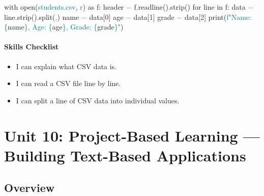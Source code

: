 \documentclass[
  justified,
  openright,
]{tufte-book}
\let\subsubsection\paragraph
\let\paragraph\paragraph
\newcommand{\BuiltInTok}[1]{#1}
\newcommand{\ControlFlowTok}[1]{\textcolor{BrandBlue}{#1}}
\newcommand{\DecValTok}[1]{\textcolor{Purple}{#1}}
\newcommand{\ImportTok}[1]{\textcolor{BrandAccent}{#1}}
\newcommand{\KeywordTok}[1]{\textcolor{BrandBlue}{#1}}
\newcommand{\NormalTok}[1]{#1}
\newcommand{\OperatorTok}[1]{\textcolor{DarkGray}{#1}}
\newcommand{\SpecialCharTok}[1]{\textcolor{Teal}{#1}}
\newcommand{\SpecialStringTok}[1]{\textcolor{Teal}{#1}}
\newcommand{\StringTok}[1]{\textcolor{Teal}{#1}}
\newenvironment{Shaded}{%
  \begin{snugshade}
}{%
  \end{snugshade}
}
\let\subsubsection\paragraph
\let\paragraph\paragraph
\providecommand{\tightlist}{%
  \setlength{\itemsep}{0pt}\setlength{\parskip}{0pt}}
\begin{document}
\begin{Shaded}
\begin{Highlighting}[]
\ControlFlowTok{with} \BuiltInTok{open}\NormalTok{(}\StringTok{\textquotesingle{}students.csv\textquotesingle{}}\NormalTok{, }\StringTok{\textquotesingle{}r\textquotesingle{}}\NormalTok{) }\ImportTok{as}\NormalTok{ f:}
\NormalTok{    header }\OperatorTok{=}\NormalTok{ f.readline().strip()}
    \ControlFlowTok{for}\NormalTok{ line }\KeywordTok{in}\NormalTok{ f:}
\NormalTok{        data }\OperatorTok{=}\NormalTok{ line.strip().split(}\StringTok{\textquotesingle{},\textquotesingle{}}\NormalTok{)}
\NormalTok{        name }\OperatorTok{=}\NormalTok{ data[}\DecValTok{0}\NormalTok{]}
\NormalTok{        age }\OperatorTok{=}\NormalTok{ data[}\DecValTok{1}\NormalTok{]}
\NormalTok{        grade }\OperatorTok{=}\NormalTok{ data[}\DecValTok{2}\NormalTok{]}
        \BuiltInTok{print}\NormalTok{(}\SpecialStringTok{f"Name: }\SpecialCharTok{\{}\NormalTok{name}\SpecialCharTok{\}}\SpecialStringTok{, Age: }\SpecialCharTok{\{}\NormalTok{age}\SpecialCharTok{\}}\SpecialStringTok{, Grade: }\SpecialCharTok{\{}\NormalTok{grade}\SpecialCharTok{\}}\SpecialStringTok{"}\NormalTok{)}
\end{Highlighting}
\end{Shaded}

\subsubsection{Skills Checklist}\label{skills-checklist-46}

\begin{itemize}
\tightlist
\item[$\square$]
  I can explain what CSV data is.
\item[$\square$]
  I can read a CSV file line by line.
\item[$\square$]
  I can split a line of CSV data into individual values.
\end{itemize}

\newpage

\section{Unit 10: Project-Based Learning --- Building Text-Based
Applications}\label{unit-10-project-based-learning-building-text-based-applications}

\subsection{Overview}\label{overview-10}
\end{document}
